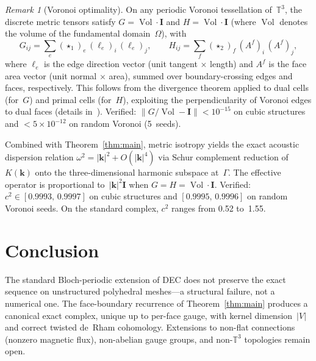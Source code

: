 \documentclass[11pt]{article}
\theoremstyle{remark}
\newtheorem{remark}[theorem]{Remark}
\newcommand{\bk}{\mathbf{k}}
\newcommand{\TT}{\mathbb{T}}
\newcommand{\Vol}{\operatorname{Vol}}
\newcommand{\Id}{\mathbf{I}}
\begin{document}
\begin{remark}[Voronoi optimality]\label{rem:voronoi}
On any periodic Voronoi tessellation of~$\TT^3$, the discrete metric
tensors satisfy $G = \Vol\cdot\Id$ and $H = \Vol\cdot\Id$ (where
$\Vol$ denotes the volume of the fundamental domain~$\Omega$), with
\[
G_{ij} = \sum_e (\star_1)_e\,(\boldsymbol{\ell}_e)_i\,(\boldsymbol{\ell}_e)_j,
\qquad
H_{ij} = \sum_f (\star_2)_f\,(A^f)_i\,(A^f)_j,
\]
where $\boldsymbol{\ell}_e$ is the edge direction vector (unit tangent
$\times$ length) and $A^f$ is the face area vector (unit normal $\times$
area), summed over boundary-crossing edges and faces, respectively. This
follows from the divergence theorem applied to dual cells (for~$G$) and
primal cells (for~$H$), exploiting the perpendicularity of Voronoi edges
to dual faces (details in~\cite{Toader_prep}). Verified:
$\|G/\Vol - \Id\| < 10^{-15}$ on cubic structures and
$< 5 \times 10^{-12}$ on random Voronoi (5~seeds).

Combined with Theorem~\ref{thm:main}, metric isotropy yields the exact
acoustic dispersion relation $\omega^2 = |\bk|^2 + O(|\bk|^4)$ via Schur
complement reduction of~$K(\bk)$ onto the three-dimensional harmonic
subspace at~$\Gamma$. The effective operator is proportional
to~$|\bk|^2\Id$ when $G = H = \Vol\cdot\Id$. Verified:
$c^2 \in [0.9993,\,0.9997]$ on cubic structures and
$[0.9995,\,0.9996]$ on random Voronoi seeds. On the standard complex,
$c^2$ ranges from 0.52 to~1.55.
\end{remark}

\section{Conclusion}\label{sec:conclusion}

The standard Bloch-periodic extension of DEC does not preserve the exact
sequence on unstructured polyhedral meshes---a structural failure, not a
numerical one. The face-boundary recurrence of Theorem~\ref{thm:main}
produces a canonical exact complex, unique up to per-face gauge, with
kernel dimension~$|V|$ and correct twisted de~Rham cohomology. Extensions
to non-flat connections (nonzero magnetic flux), non-abelian gauge groups,
and non-$\TT^3$ topologies remain open.

\end{document}
